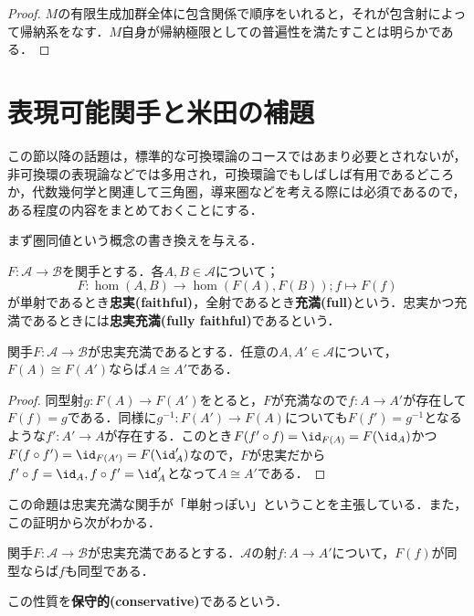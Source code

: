 \begin{proof}
	$M$の有限生成加群全体に包含関係で順序をいれると，それが包含射によって帰納系をなす．$M$自身が帰納極限としての普遍性を満たすことは明らかである．
\end{proof}
\section{表現可能関手と米田の補題}
この節以降の話題は，標準的な可換環論のコースではあまり必要とされないが，非可換環の表現論などでは多用され，可換環論でもしばしば有用であるどころか，代数幾何学と関連して三角圏，導来圏などを考える際には必須であるので，ある程度の内容をまとめておくことにする．

まず圏同値という概念の書き換えを与える．

\begin{defi}[忠実，充満]
	$F:\mathscr{A}\to\mathscr{B}$を関手とする．各$A,B\in\mathscr{A}$について；
	\[F:\hom(A,B)\to\hom(F(A),F(B));f\mapsto F(f)\]
	が単射であるとき\textbf{忠実(faithful)}，全射であるとき\textbf{充満(full)}という．忠実かつ充満であるときには\textbf{忠実充満(fully faithful)}であるという．
\end{defi}

\begin{prop}\label{prop:忠実充満は本質的単射}
	関手$F:\mathscr{A}\to\mathscr{B}$が忠実充満であるとする．任意の$A,A'\in\mathscr{A}$について，$F(A)\cong F(A')$ならば$A\cong A'$である．
\end{prop}

\begin{proof}
	同型射$g:F(A)\to F(A')$をとると，$F$が充満なので$f:A\to A'$が存在して$F(f)=g$である．同様に$g^{-1}:F(A')\to F(A)$についても$F(f')=g^{-1}$となるような$f':A'\to A$が存在する．このとき$F(f'\circ f)=\id_{F(A)}=F(\id_{A})$かつ$F(f\circ f')=\id_{F(A')}=F(\id_A')$なので，$F$が忠実だから$f'\circ f=\id_A,f\circ f'=\id_A'$となって$A\cong A'$である．
\end{proof}

この命題は忠実充満な関手が「単射っぽい」ということを主張している．また，この証明から次がわかる．

\begin{lem}\label{lem:忠実充満はconservative}
	関手$F:\mathscr{A}\to\mathscr{B}$が忠実充満であるとする．$\mathscr{A}$の射$f:A\to A'$について，$F(f)$が同型ならば$f$も同型である．
\end{lem}

この性質を\textbf{保守的(conservative)}であるという．

